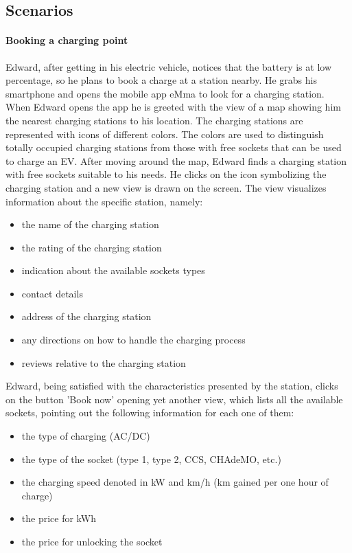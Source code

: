 \subsection{Scenarios}
\paragraph{Booking a charging point}
Edward, after getting in his electric vehicle, notices that the battery is at low percentage, so he plans to book a charge at a station nearby. He grabs his smartphone and opens the mobile app eMma to look for a charging station. When Edward opens the app he is greeted with the view of a map showing him the nearest charging stations to his location. The charging stations are represented with icons of different colors. The colors are used to distinguish totally occupied charging stations from those with free sockets that can be used to charge an EV. After moving around the map, Edward finds a charging station with free sockets suitable to his needs. He clicks on the icon symbolizing the charging station and a new view is drawn on the screen. The view visualizes information about the specific station, namely:
\begin{itemize}
    \item the name of the charging station
    \item the rating of the charging station
    \item indication about the available sockets types
    \item contact details
    \item address of the charging station
    \item any directions on how to handle the charging process
    \item reviews relative to the charging station
\end{itemize}
Edward, being satisfied with the characteristics presented by the station, clicks on the button 'Book now' opening yet another view, which lists all the available sockets, pointing out the following information for each one of them:
\begin{itemize}
    \item the type of charging (AC/DC)
    \item the type of the socket (type 1, type 2, CCS, CHAdeMO, etc.)
    \item the charging speed denoted in kW and km/h (km gained per one hour of charge)
    \item the price for kWh
    \item the price for unlocking the socket
\end{itemize}
